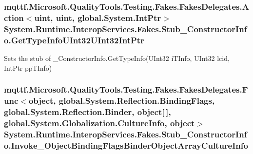 \hypertarget{class_system_1_1_runtime_1_1_interop_services_1_1_fakes_1_1_stub___constructor_info_aaddcb8694c64ce14c8774edcdab67e00}{
\subsubsection[{Get\-Type\-Info\-U\-Int32\-U\-Int32\-Int\-Ptr}]{\setlength{\rightskip}{0pt plus 5cm}mqttf.\-Microsoft.\-Quality\-Tools.\-Testing.\-Fakes.\-Fakes\-Delegates.\-Action$<$uint, uint, global.\-System.\-Int\-Ptr$>$ System.\-Runtime.\-Interop\-Services.\-Fakes.\-Stub\-\_\-\-Constructor\-Info.\-Get\-Type\-Info\-U\-Int32\-U\-Int32\-Int\-Ptr}}\label{class_system_1_1_runtime_1_1_interop_services_1_1_fakes_1_1_stub___constructor_info_aaddcb8694c64ce14c8774edcdab67e00}


Sets the stub of \-\_\-\-Constructor\-Info.\-Get\-Type\-Info(\-U\-Int32 i\-T\-Info, U\-Int32 lcid, Int\-Ptr pp\-T\-Info)

\hypertarget{class_system_1_1_runtime_1_1_interop_services_1_1_fakes_1_1_stub___constructor_info_a6488bd51e3d178e73b909cd5f20f26a7}{
\subsubsection[{Invoke\-\_\-2\-Object\-Binding\-Flags\-Binder\-Object\-Array\-Culture\-Info}]{\setlength{\rightskip}{0pt plus 5cm}mqttf.\-Microsoft.\-Quality\-Tools.\-Testing.\-Fakes.\-Fakes\-Delegates.\-Func$<$object, global.\-System.\-Reflection.\-Binding\-Flags, global.\-System.\-Reflection.\-Binder, object\mbox{[}$\,$\mbox{]}, global.\-System.\-Globalization.\-Culture\-Info, object$>$ System.\-Runtime.\-Interop\-Services.\-Fakes.\-Stub\-\_\-\-Constructor\-Info.\-Invoke\-\_\-Object\-Binding\-Flags\-Binder\-Object\-Array\-Culture\-Info}}\label{class_system_1_1_runtime_1_1_interop_services_1_1_fakes_1_1_stub___constructor_info_a6488bd51e3d178e73b909cd5f20f26a7}


